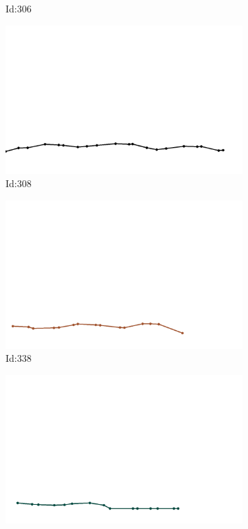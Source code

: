 \documentclass[12pt,twoside]{report}
\begin{document}
\begin{figure}
\begin{subfigure}[b]{0.20\textwidth}
\caption{Id:306}
\end{subfigure}
\begin{subfigure}[b]{0.20\textwidth}
\centering
\includegraphics[width=\textwidth]{../trajectories/308.png}
\caption{Id:308}
\end{subfigure}
\begin{subfigure}[b]{0.20\textwidth}
\centering
\includegraphics[width=\textwidth]{../trajectories/338.png}
\caption{Id:338}
\end{subfigure}
\begin{subfigure}[b]{0.20\textwidth}
\centering
\includegraphics[width=\textwidth]{../trajectories/346.png}

\end{subfigure}
\end{figure}
\end{document}
